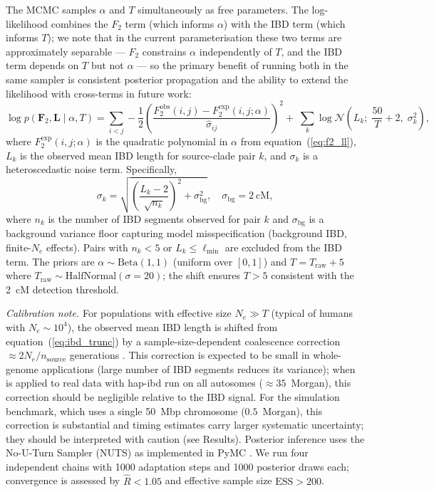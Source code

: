 The MCMC samples $\alpha$ and $T$ simultaneously as free parameters.
The log-likelihood combines the $F_2$ term (which informs $\alpha$) with
the IBD term (which informs $T$); we note that in the current parameterisation
these two terms are approximately separable --- $F_2$ constrains $\alpha$
independently of $T$, and the IBD term depends on $T$ but not $\alpha$ ---
so the primary benefit of running both in the same sampler is consistent posterior
propagation and the ability to extend the likelihood with cross-terms in
future work:
\begin{equation}
  \log p(\mathbf{F}_2, \mathbf{L} \mid \alpha, T)
  = \sum_{i<j} -\frac{1}{2}
      \!\left(\frac{F_2^{\mathrm{obs}}(i,j) - F_2^{\mathrm{exp}}(i,j;\alpha)}
                    {\hat{\sigma}_{ij}}\right)^{\!2}
  +\; \sum_k \log \mathcal{N}\!\left(
      L_k;\; \frac{50}{T} + 2,\; \sigma_k^2
    \right),
  \label{eq:lik}
\end{equation}
where $F_2^{\mathrm{exp}}(i,j;\alpha)$ is the quadratic polynomial in $\alpha$
from equation~(\ref{eq:f2_ll}), $L_k$ is the observed mean IBD length for
source-clade pair $k$, and $\sigma_k$ is a heteroscedastic noise term.
Specifically,
\begin{equation}
  \sigma_k = \sqrt{\left(\frac{L_k - 2}{\sqrt{n_k}}\right)^2 + \sigma_{\mathrm{bg}}^2},
  \quad \sigma_{\mathrm{bg}} = 2~\text{cM},
  \label{eq:ibd_sigma}
\end{equation}
where $n_k$ is the number of IBD segments observed for pair $k$ and $\sigma_{\mathrm{bg}}$
is a background variance floor capturing model misspecification (background IBD,
finite-$N_e$ effects).
Pairs with $n_k < 5$ or $L_k \leq \ell_{\min}$ are excluded from the IBD term.
The priors are $\alpha \sim \mathrm{Beta}(1,1)$ (uniform over $[0,1]$) and
$T = T_{\mathrm{raw}} + 5$ where $T_{\mathrm{raw}} \sim \mathrm{HalfNormal}(\sigma = 20)$;
the shift ensures $T > 5$ consistent with the 2~cM detection threshold.

\emph{Calibration note.}
For populations with effective size $N_e \gg T$ (typical of humans with
$N_e \sim 10^4$), the observed mean IBD length is shifted from
equation~(\ref{eq:ibd_trunc}) by a sample-size-dependent coalescence
correction $\approx 2N_e / n_{\mathrm{source}}$ generations
\citep{Palamara2012}.
This correction is expected to be small in whole-genome applications
(large number of IBD segments reduces its variance); when \hapgraph{} is
applied to real data with hap-ibd run on all autosomes
($\approx 35$~Morgan), this correction should be negligible relative to
the IBD signal.
For the simulation benchmark, which uses a single 50~Mbp chromosome
($0.5$~Morgan), this correction is substantial and timing estimates
carry larger systematic uncertainty; they should be interpreted with caution
(see Results).
Posterior inference uses the No-U-Turn Sampler (NUTS)
\citep{Hoffman2014} as implemented in PyMC \citep{AbrilPimentel2023}.
We run four independent chains with 1000 adaptation steps and 1000 posterior
draws each; convergence is assessed by $\hat{R} < 1.05$ and effective sample
size $\mathrm{ESS} > 200$.

